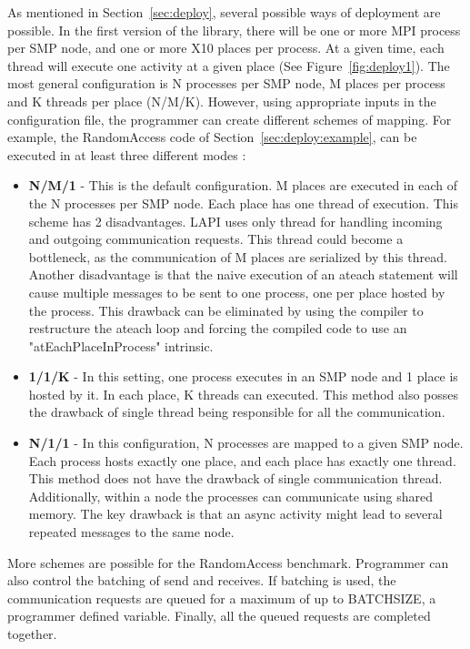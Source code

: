 As mentioned in Section~\ref{sec:deploy}, several possible ways of
deployment are possible.  In the first version of the library, there
will be one or more MPI process per SMP node, and one or more X10
places per process. At a given time, each thread will execute one
activity at a given place (See Figure~\ref{fig:deploy1}). The most
general configuration is N processes per SMP node, M places per
process and K threads per place (N/M/K). However, using appropriate
inputs in the configuration file, the programmer can create different
schemes of mapping. For example, the RandomAccess code of
Section~\ref{sec:deploy:example}, can be executed in at least three
different modes :

\begin{itemize}
\item {\bf N/M/1} - This is the default configuration. M places are
executed in each of the N processes per SMP node. Each place has one
thread of execution. This scheme has 2 disadvantages. LAPI uses only
thread for handling incoming and outgoing communication requests. This
thread could become a bottleneck, as the communication of M places are
serialized by this thread. Another disadvantage is that the naive
execution of an ateach statement will cause multiple messages to be
sent to one process, one per place hosted by the process. This
drawback can be eliminated by using the compiler to restructure the
ateach loop and forcing the compiled code to use an
"atEachPlaceInProcess" intrinsic.

\item {\bf 1/1/K} - In this setting, one process executes in an SMP
node and 1 place is hosted by it. In each place, K threads can
executed. This method also posses the drawback of single thread being
responsible for all the communication.

\item {\bf N/1/1} - In this configuration, N processes are mapped to a
given SMP node. Each process hosts exactly one place, and each place
has exactly one thread. This method does not have the drawback of
single communication thread. Additionally, within a node the processes
can communicate using shared memory. The key drawback is that an async
activity might lead to several repeated messages to the same node.
\end{itemize}

More schemes are possible for the RandomAccess benchmark. Programmer
can also control the batching of send and receives. If batching is
used, the communication requests are queued for a maximum of up to
BATCHSIZE, a programmer defined variable. Finally, all the queued
requests are completed together.
